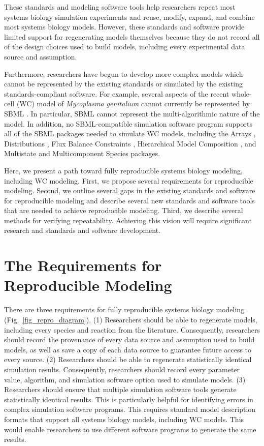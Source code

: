 \documentclass[journal,transmag,twoside]{IEEEtran}
\begin{document}
These standards and modeling software tools help researchers repeat most systems biology simulation experiments and reuse, modify, expand, and combine most systems biology models. However, these standards and software provide limited support for regenerating models themselves because they do not record all of the design choices used to build models, including every experimental data source and assumption.

Furthermore, researchers have begun to develop more complex models which cannot be represented by the existing standards or simulated by the existing standards-compliant software. For example, several aspects of the recent whole-cell (WC) model of \textit{Mycoplasma genitalium} \cite{Karr2012} cannot currently be represented by SBML \cite{Waltemath2016}. In particular, SBML cannot represent the multi-algorithmic nature of the model. In addition, no SBML-compatible simulation software program supports all of the SBML packages needed to simulate WC models, including the Arrays \cite{watanabe2016efficient}, Distributions \cite{Moodie2015}, Flux Balance Constraints \cite{olivier2015fbc}, Hierarchical Model Composition \cite{smith2015sbml}, and Multistate and Multicomponent Species \cite{SBMLMulti} packages.

Here, we present a path toward fully reproducible systems biology modeling, including WC modeling. First, we propose several requirements for reproducible modeling. Second, we outline several gaps in the existing standards and software for reproducible modeling and describe several new standards and software tools that are needed to achieve reproducible modeling. Third, we describe several methods for verifying repeatability. Achieving this vision will require significant research and standards and software development.

\section{The Requirements for Reproducible Modeling}

There are three requirements for fully reproducible systems biology modeling (Fig.~\ref{fig_repro_diagram}). (1) Researchers should be able to regenerate models, including every species and reaction from the literature. Consequently, researchers should record the provenance of every data source and assumption used to build models, as well as save a copy of each data source to guarantee future access to every source. (2) Researchers should be able to regenerate statistically identical simulation results. Consequently, researchers should record every parameter value, algorithm, and simulation software option used to simulate models. (3) Researchers should ensure that multiple simulation software tools generate statistically identical results. This is particularly helpful for identifying errors in complex simulation software programs. This requires standard model description formats that support all systems biology models, including WC models. This would enable researchers to use different software programs to generate the same results.
\end{document}
